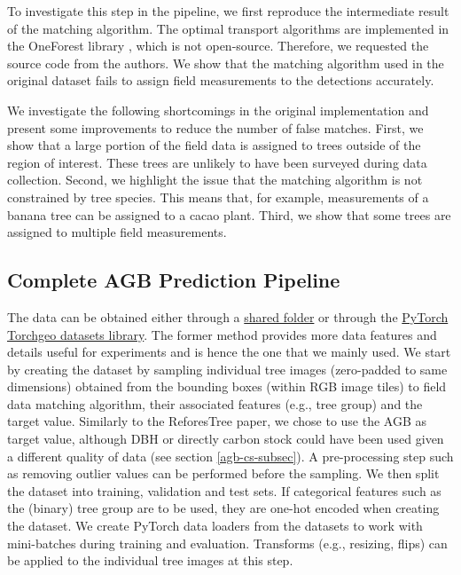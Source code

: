 \documentclass[10pt,twocolumn,letterpaper]{article}
\begin{document}
To investigate this step in the pipeline, we first reproduce the intermediate result of the matching algorithm.
The optimal transport algorithms are implemented in the OneForest library \cite{weinstein2020cross}, which is not open-source. Therefore, we requested the source code from the authors.
We show that the matching algorithm used in the original dataset fails to assign field measurements to the detections accurately.

We investigate the following shortcomings in the original implementation and present some improvements to reduce the number of false matches.
First, we show that a large portion of the field data is assigned to trees outside of the region of interest.
These trees are unlikely to have been surveyed during data collection.
Second, we highlight the issue that the matching algorithm is not constrained by tree species.
This means that, for example, measurements of a banana tree can be assigned to a cacao plant.
Third, we show that some trees are assigned to multiple field measurements.


\subsection{Complete AGB Prediction Pipeline}\label{agb-pred-subsec}
The data can be obtained either through a \href{https://github.com/gyrrei/ReforesTree}{shared folder} or through the \href{ https://torchgeo.readthedocs.io/en/latest/api/datasets.html#reforestree}{PyTorch Torchgeo datasets library}. The former method provides more data features and details useful for experiments and is hence the one that we mainly used. We start by creating the dataset by sampling individual tree images (zero-padded to same dimensions) obtained from the bounding boxes (within RGB image tiles) to field data matching algorithm, their associated features (e.g., tree group) and the target value. Similarly to the ReforesTree paper, we chose to use the AGB as target value, although DBH or directly carbon stock could have been used given a different quality of data (see section \ref{agb-cs-subsec}). A pre-processing step such as removing outlier values can be performed before the sampling. We then split the dataset into training, validation and test sets. If categorical features such as the (binary) tree group are to be used, they are one-hot encoded when creating the dataset. We create PyTorch data loaders from the datasets to work with mini-batches during training and evaluation. Transforms (e.g., resizing, flips) can be applied to the individual tree images at this step.
\end{document}
